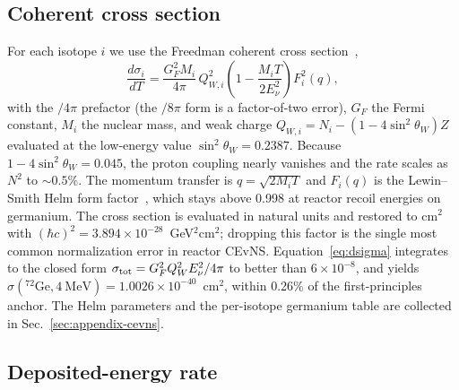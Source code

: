\subsection{Coherent cross section}

For each isotope $i$ we use the Freedman coherent cross section~\cite{freedman1974,drukier1984},
\begin{equation}
\frac{d\sigma_i}{dT} = \frac{G_F^2 M_i}{4\pi}\, Q_{W,i}^2\left(1 - \frac{M_i T}{2 E_\nu^2}\right) F_i^2(q),
\label{eq:dsigma}
\end{equation}
with the $/4\pi$ prefactor (the $/8\pi$ form is a factor-of-two error), $G_F$ the Fermi constant, $M_i$ the nuclear mass, and weak charge $Q_{W,i}=N_i-(1-4\sin^2\theta_W)Z$ evaluated at the low-energy value $\sin^2\theta_W=0.2387$. Because $1-4\sin^2\theta_W=0.045$, the proton coupling nearly vanishes and the rate scales as $N^2$ to $\sim0.5\%$. The momentum transfer is $q=\sqrt{2M_i T}$ and $F_i(q)$ is the Lewin--Smith Helm form factor~\cite{lewinsmith1996,helm1956}, which stays above 0.998 at reactor recoil energies on germanium. The cross section is evaluated in natural units and restored to cm$^2$ with $(\hbar c)^2=3.894\times10^{-28}$~GeV$^2$cm$^2$; dropping this factor is the single most common normalization error in reactor CEvNS. Equation~\eqref{eq:dsigma} integrates to the closed form $\sigma_{\rm tot}=G_F^2 Q_W^2 E_\nu^2/4\pi$ to better than $6\times10^{-8}$, and yields $\sigma({}^{72}\mathrm{Ge},4~\mathrm{MeV})=1.0026\times10^{-40}$~cm$^2$, within 0.26\% of the first-principles anchor. The Helm parameters and the per-isotope germanium table are collected in Sec.~\ref{sec:appendix-cevns}.

\subsection{Deposited-energy rate}

